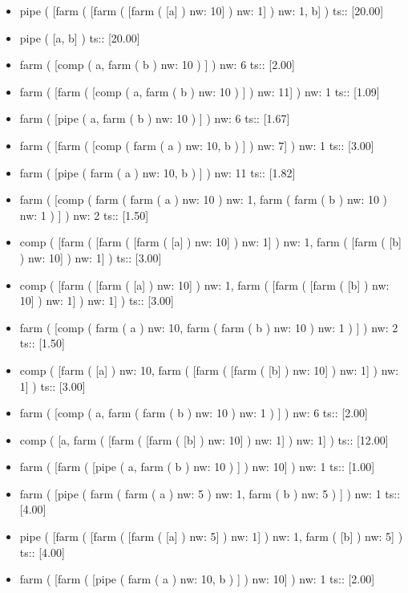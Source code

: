 \documentclass[12pt]{report}
\begin{document}
{\begin{itemize}
\item pipe  ( [farm  ( [farm  ( [farm  ( [a] )  nw: 10] )  nw: 1] )  nw: 1, b] )  ts::  [20.00] 
\item pipe  ( [a, b] )  ts::  [20.00] 
\item farm  ( [comp ( a, farm  ( b )  nw: 10 ) ] )  nw: 6 ts::  [2.00] 
\item farm  ( [farm  ( [comp ( a, farm  ( b )  nw: 10 ) ] )  nw: 11] )  nw: 1 ts::  [1.09] 
\item farm  ( [pipe ( a, farm  ( b )  nw: 10 ) ] )  nw: 6 ts::  [1.67] 
\item farm  ( [farm  ( [comp ( farm  ( a )  nw: 10, b ) ] )  nw: 7] )  nw: 1 ts::  [3.00] 
\item farm  ( [pipe ( farm  ( a )  nw: 10, b ) ] )  nw: 11 ts::  [1.82] 
\item farm  ( [comp ( farm  ( farm  ( a )  nw: 10 )  nw: 1, farm  ( farm  ( b )  nw: 10 )  nw: 1 ) ] )  nw: 2 ts::  [1.50] 
\item comp  ( [farm  ( [farm  ( [farm  ( [a] )  nw: 10] )  nw: 1] )  nw: 1, farm  ( [farm  ( [b] )  nw: 10] )  nw: 1] )  ts::  [3.00] 
\item comp  ( [farm  ( [farm  ( [a] )  nw: 10] )  nw: 1, farm  ( [farm  ( [farm  ( [b] )  nw: 10] )  nw: 1] )  nw: 1] )  ts::  [3.00] 
\item farm  ( [comp ( farm  ( a )  nw: 10, farm  ( farm  ( b )  nw: 10 )  nw: 1 ) ] )  nw: 2 ts::  [1.50] 
\item comp  ( [farm  ( [a] )  nw: 10, farm  ( [farm  ( [farm  ( [b] )  nw: 10] )  nw: 1] )  nw: 1] )  ts::  [3.00] 
\item farm  ( [comp ( a, farm  ( farm  ( b )  nw: 10 )  nw: 1 ) ] )  nw: 6 ts::  [2.00] 
\item comp  ( [a, farm  ( [farm  ( [farm  ( [b] )  nw: 10] )  nw: 1] )  nw: 1] )  ts::  [12.00] 
\item farm  ( [farm  ( [pipe ( a, farm  ( b )  nw: 10 ) ] )  nw: 10] )  nw: 1 ts::  [1.00] 
\item farm  ( [pipe ( farm  ( farm  ( a )  nw: 5 )  nw: 1, farm  ( b )  nw: 5 ) ] )  nw: 1 ts::  [4.00] 
\item pipe  ( [farm  ( [farm  ( [farm  ( [a] )  nw: 5] )  nw: 1] )  nw: 1, farm  ( [b] )  nw: 5] )  ts::  [4.00] 
\item farm  ( [farm  ( [pipe ( farm  ( a )  nw: 10, b ) ] )  nw: 10] )  nw: 1 ts::  [2.00] 
\end{itemize}}
\end{document}
